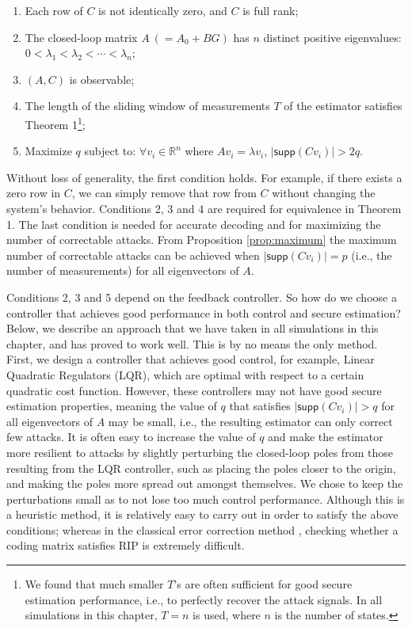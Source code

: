 \documentclass[../../thesis.tex]{subfiles}
\begin{document}
\begin{enumerate}
	\item Each row of $C$ is not identically zero, and $C$ is full rank;
	\item The closed-loop matrix $A~(=A_0+BG)$ has $n$ distinct positive eigenvalues: $0< \lambda_1 < \lambda_2 < \cdots < \lambda _n$;
	\item $(A,C)$ is observable;
	\item The length of the sliding window of measurements $T$ of the estimator satisfies Theorem 1\footnote{We found that much smaller $T$'s are often sufficient for good secure estimation performance, i.e., to perfectly recover the attack signals. In all simulations in this chapter, $T=n$ is used, where $n$ is the number of states.};
	\item Maximize $q$ subject to: $\forall v_i \in \mathbb{R}^n$ where $Av_i = \lambda v_i$, $\lvert \textsf{supp} (C v_i)  \rvert > 2q$.
\end{enumerate}
Without loss of generality, the first condition holds. For example, if there exists a zero row in $C$, we can simply remove that row from $C$ without changing the system's behavior. Conditions 2, 3 and 4 are required for equivalence in Theorem 1. The last condition is needed for accurate decoding and for maximizing the number of correctable attacks. From Proposition \ref{prop:maximum} the maximum number of correctable attacks can be achieved when $\lvert \textsf{supp} (C v_i)  \rvert = p$ (i.e., the number of measurements) for all eigenvectors of $A$. 

Conditions 2, 3 and 5 depend on the feedback controller. So how do we choose a controller that achieves good performance in both control and secure estimation? Below, we describe an approach that we have taken in all simulations in this chapter, and has proved to work well. This is by no means the only method. First, we design a controller that achieves good control, for example, Linear Quadratic Regulators (LQR), which are optimal with respect to a certain quadratic cost function. However, these controllers may not have good secure estimation properties, meaning the value of $q$ that satisfies $\lvert \textsf{supp} (C v_i) \rvert > q$ for all eigenvectors of $A$ may be small, i.e., the resulting estimator can only correct few attacks. It is often easy to increase the value of $q$ and make the estimator more resilient to attacks by slightly perturbing the closed-loop poles from those resulting from the LQR controller, such as placing the poles closer to the origin, and making the poles more spread out amongst themselves. We chose to keep the perturbations small as to not lose too much control performance.  
Although this is a heuristic method, it is relatively easy to carry out in order to satisfy the above conditions; whereas in the classical error correction method \cite{tao11}, checking whether a coding matrix satisfies RIP is extremely difficult.
\end{document}
